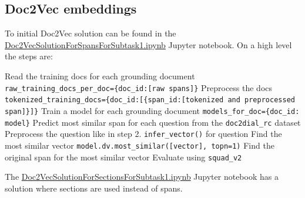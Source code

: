 \documentclass[11pt]{article}
\begin{document}
    \subsection{Doc2Vec embeddings}\label{subsec:doc2vec-experiment}
    To initial Doc2Vec solution can be found in the \href{https://github.com/isabelladegen/nlp-2021/blob/main/notebooks/Doc2VecSolutionForSpansForSubtask1.ipynb}{Doc2VecSolutionForSpansForSubtask1.ipynb}
    Jupyter notebook.
    On a high level the steps are:
    \begin{outline}[enumerate]
        \1 Read the training docs for each grounding document \texttt{raw\_training\_docs\_per\_doc=\{doc\_id:[raw spans]\}}
        \1 Preprocess the docs \texttt{tokenized\_training\_docs=\{doc\_id:[\{span\_id:[tokenized and preprocessed span]\}]\}}
        \1 Train a model for each grounding document \texttt{models\_for\_doc=\{doc\_id: model\}}
        \1 Predict most similar span for each question from the \texttt{doc2dial\_rc} dataset
        \2 Preprocess the question like in step 2.
        \2 \texttt{infer\_vector()} for question
        \2 Find the most similar vector \texttt{model.dv.most\_similar([vector], topn=1)}
        \2 Find the original span for the most similar vector
        \1 Evaluate using \texttt{squad\_v2} \cite{squad2git,gitTheStandfordQADataset,Rajpurkar2016SQuAD10}
    \end{outline}

    The \href{https://github.com/isabelladegen/nlp-2021/blob/main/notebooks/Doc2VecSolutionForSectionsForSubtask1.ipynb}{Doc2VecSolutionForSectionsForSubtask1.ipynb}
    Jupyter notebook has a solution where sections are used instead of spans.
\end{document}
